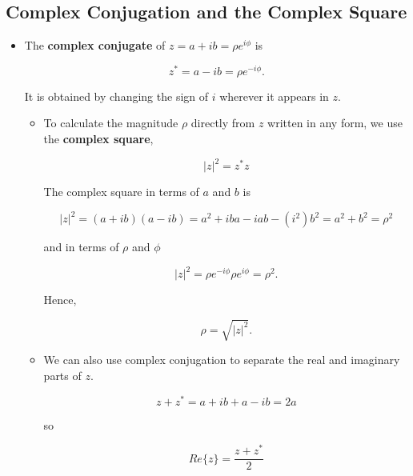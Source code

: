\documentclass[12pt]{article}
\begin{document}
\subsection*{Complex Conjugation and the Complex Square}
\begin{itemize}
\item The \textbf{complex conjugate} of $z = a + ib = \rho e^{i\phi}$
  is
  
  \begin{equation}
  z^* = a - ib = \rho e^{-i \phi}.
  \end{equation}

  \noindent
  It is obtained by changing the sign of $i$ wherever it appears in $z$.

  \begin{itemize}
  \item To calculate the magnitude $\rho$ directly from $z$ written in
    any form, we use the \textbf{complex square}, 

    \begin{equation}
    |z|^2 = z^* z
    \end{equation}

    \noindent
    The complex square in terms of $a$ and $b$ is

    \begin{equation}
      |z|^2 = (a + ib)(a - ib) = a^2 + iba - iab - (i^2)b^2 
      = a^2 + b^2 = \rho^2
    \end{equation}

    \noindent
    and in terms of $\rho$ and $\phi$

    \begin{equation}
    |z|^2 = \rho e^{-i \phi} \rho e^{i \phi} = \rho^2.
    \end{equation}

    \noindent
    Hence,

    \begin{equation}
      \rho = \sqrt{|z|^2}.
    \end{equation}

  \item We can also use complex conjugation to separate the real and
    imaginary parts of $z$.

    \begin{equation}
    z + z^* = a + ib + a - ib = 2a
    \end{equation}

    \noindent
    so

    \begin{equation}
      \label{eq:Re}
      Re\{z\} = \frac{z + z^*}{2}
    \end{equation}


\end{itemize}
\end{itemize}
\end{document}
